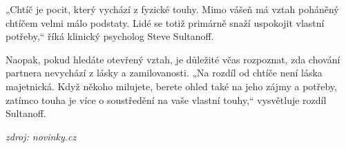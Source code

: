 \documentclass[13pt, a4paper, twoside]{article}
\begin{document}
„Chtíč je pocit, který vychází z fyzické touhy. Mimo vášeň má vztah poháněný chtíčem velmi málo podstaty. Lidé se totiž primárně snaží uspokojit vlastní potřeby,“ říká klinický psycholog Steve Sultanoff.

Naopak, pokud hledáte otevřený vztah, je důležité včas rozpoznat, zda chování partnera nevychází z lásky a zamilovanosti. „Na rozdíl od chtíče není láska majetnická. Když někoho milujete, berete ohled také na jeho zájmy a potřeby, zatímco touha je více o soustředění na vaše vlastní touhy,“ vysvětluje rozdíl Sultanoff.

\hspace*{\fill} \emph{zdroj: novinky.cz}
\end{document}
